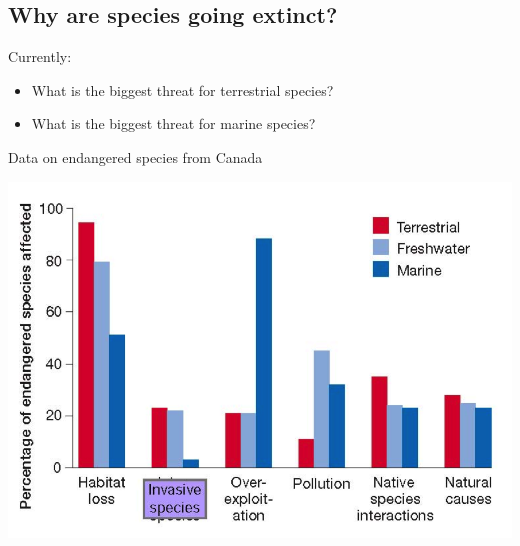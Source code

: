 \subsection{Why are species going extinct?}

\begin{frame}[t]
    \begin{adjustwidth}{-2em}{-1.5em}
        Currently:
        \begin{itemize}

            \item What is the biggest threat for terrestrial species?


                \vspace{3cm}
            \item What is the biggest threat for marine species?

        \end{itemize}
    \end{adjustwidth}
\end{frame}

\begin{frame}[t]
    \begin{adjustwidth}{-2em}{-1.5em}
        \vspace{-3mm}
        Data on endangered species from Canada

        \begin{center}
            \includegraphics[width=0.8\linewidth]{endangered-threats.png}
        \end{center}
    \end{adjustwidth}
\end{frame}

